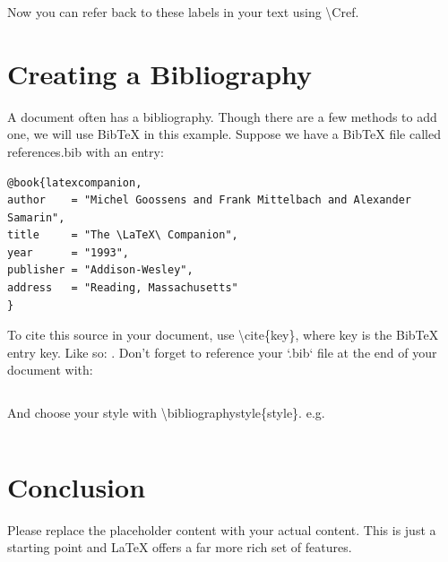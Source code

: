 \documentclass[11pt]{article}
\begin{document}
Now you can refer back to these labels in your text using \textbackslash Cref.

\section{Creating a Bibliography}
A document often has a bibliography. Though there are a few methods to add one, we will use BibTeX in this example. Suppose we have a BibTeX file called references.bib with an entry:

\begin{verbatim}
@book{latexcompanion,
author    = "Michel Goossens and Frank Mittelbach and Alexander Samarin",
title     = "The \LaTeX\ Companion",
year      = "1993",
publisher = "Addison-Wesley",
address   = "Reading, Massachusetts"
}
\end{verbatim}

To cite this source in your document, use \textbackslash cite\{key\}, where key is the BibTeX entry key. Like so: \cite{latexcompanion}. Don't forget to reference your `.bib` file at the end of your document with:

\begin{verbatim}

\end{verbatim}

And choose your style with \textbackslash bibliographystyle\{style\}. e.g.

\begin{verbatim}

\end{verbatim}

\section{Conclusion}
Please replace the placeholder content with your actual content. This is just a starting point and \LaTeX{} offers a far more rich set of features.

\backmatter
\makereferences
\appendix

\end{document}
